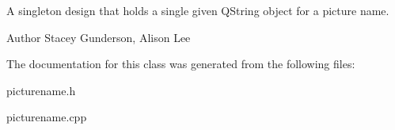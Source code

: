 A singleton design that holds a single given Q\+String object for a picture name. 

\begin{DoxyAuthor}{Author}
Stacey Gunderson, Alison Lee 
\end{DoxyAuthor}


The documentation for this class was generated from the following files\+:\begin{DoxyCompactItemize}
\item 
picturename.\+h\item 
picturename.\+cpp\end{DoxyCompactItemize}
